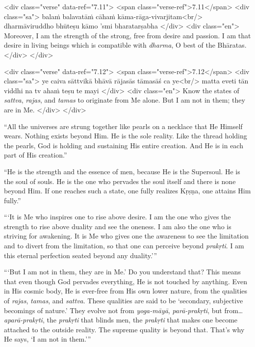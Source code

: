 \begin{html}
<div class="verse" data-ref="7.11">
  <span class="verse-ref">7.11</span>
  <div class="sa">
    balaṁ balavatāṁ cāhaṁ kāma-rāga-vivarjitam<br/>
    dharmāviruddho bhūteṣu kāmo ’smi bharatarṣabha
  </div>
  <div class="en">
    Moreover, I am the strength of the strong, free from desire and passion. I am that desire in living beings which is compatible with \textit{dharma}, O best of the Bhāratas.
  </div>
</div>
\end{html}



\begin{html}
<div class="verse" data-ref="7.12">
  <span class="verse-ref">7.12</span>
  <div class="sa">
    ye caiva sāttvikā bhāvā rājasās tāmasāś ca ye<br/>
    matta eveti tān viddhi na tv ahaṁ teṣu te mayi
  </div>
  <div class="en">
    Know the states of \textit{sattva}, \textit{rajas}, and \textit{tamas} to originate from Me alone. But I am not in them; they are in Me.
  </div>
</div>
\end{html}


\enquote{All the universes are strung together like pearls on a necklace that He Himself wears. Nothing exists beyond Him. He is the sole reality. Like the thread holding the pearls, God is holding and sustaining His entire creation. And He is in each part of His creation.}

\enquote{He is the strength and the essence of men, because He is the Supersoul. He is the soul of souls. He is the one who pervades the soul itself and there is none beyond Him. If one reaches such a state, one fully realizes Kṛṣṇa, one attains Him fully.}

\enquote{\enquote{It is Me who inspires one to rise above desire. I am the one who gives the strength to rise above duality and see the oneness. I am also the one who is striving for awakening. It is Me who gives one the awareness to see the limitation and to divert from the limitation, so that one can perceive beyond \textit{prakṛti}. I am this eternal perfection seated beyond any duality.}}

\enquote{\enquote{But I am not in them, they are in Me.} Do you understand that? This means that even though God pervades everything, He is not touched by anything. Even in His cosmic body, He is ever-free from His own lower nature, from the qualities of \textit{rajas}, \textit{tamas}, and \textit{sattva}. These qualities are said to be \enquote{secondary, subjective becomings of nature.} They evolve not from \textit{yoga-māyā}, \textit{parā-prakṛti}, but from\ldots \textit{aparā-prakṛti}, the \textit{prakṛti} that blinds men, the \textit{prakṛti} that makes one become attached to the outside reality. The supreme quality is beyond that. That’s why He says, \enquote{I am not in them.}}

